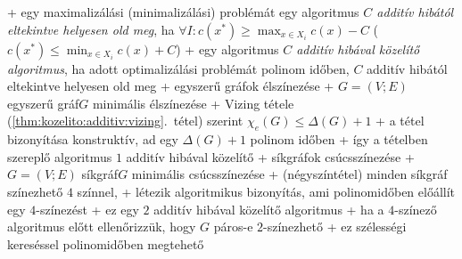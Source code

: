   
+ \dfn egy maximalizálási (minimalizálási) problémát egy algoritmus
  \emph{$C$ additív hibától eltekintve helyesen old meg}, ha $\forall I:
  c(x^*) \ge \max_{x \in X_i} c(x) - C$ ($c(x^*) \le \min_{x \in X_i}
  c(x) + C$)
+ \dfn egy algoritmus \emph{$C$ additív hibával közelítő algoritmus},
  ha adott optimalizálási problémát polinom időben, $C$ additív
  hibától eltekintve helyesen old meg
+ \prob egyszerű gráfok élszínezése
  + \DataIn $G = (V; E)$ egyszerű gráf\qquad\DataOut $G$
    minimális élszínezése
  + Vizing tétele (\ref{thm:kozelito:additiv:vizing}.~tétel) szerint
    $\chi_e(G) \le \Delta(G) + 1$
    + a tétel bizonyítása konstruktív, ad egy $\Delta(G) + 1$ polinom
      időben
    + így a tételben szereplő algoritmus $1$ additív hibával közelítő
+ \prob síkgráfok csúcsszínezése
  + \DataIn $G = (V; E)$ síkgráf\qquad\DataOut $G$
    minimális csúcsszínezése
  + \thm (négyszíntétel) minden síkgráf színezhető $4$ színnel,
    \noproof
    + létezik algoritmikus bizonyítás, ami polinomidőben előállít egy
      $4$-színezést
    + ez egy $2$ additív hibával közelítő algoritmus
  + ha a $4$-színező algoritmus előtt ellenőrizzük, hogy $G$ páros-e
    \RA $2$-színezhető
    + ez szélességi kereséssel polinomidőben megtehető
    
